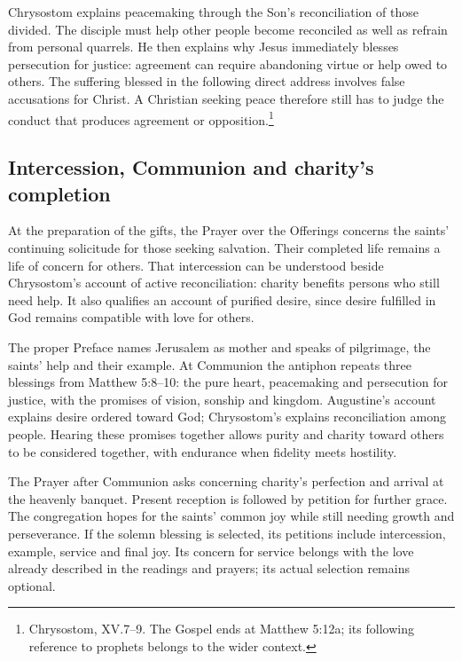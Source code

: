 Chrysostom explains peacemaking through the Son's reconciliation of those divided. The disciple must help other people become reconciled as well as refrain from personal quarrels. He then explains why Jesus immediately blesses persecution for justice: agreement can require abandoning virtue or help owed to others. The suffering blessed in the following direct address involves false accusations for Christ. A Christian seeking peace therefore still has to judge the conduct that produces agreement or opposition.\footnote{Chrysostom,  XV.7--9. The Gospel ends at Matthew 5:12a; its following reference to prophets belongs to the wider context.}

\subsection{Intercession, Communion and charity's completion}
At the preparation of the gifts, the Prayer over the Offerings concerns the saints' continuing solicitude for those seeking salvation. Their completed life remains a life of concern for others. That intercession can be understood beside Chrysostom's account of active reconciliation: charity benefits persons who still need help. It also qualifies an account of purified desire, since desire fulfilled in God remains compatible with love for others.

The proper Preface names Jerusalem as mother and speaks of pilgrimage, the saints' help and their example. At Communion the antiphon repeats three blessings from Matthew 5:8--10: the pure heart, peacemaking and persecution for justice, with the promises of vision, sonship and kingdom. Augustine's account explains desire ordered toward God; Chrysostom's explains reconciliation among people. Hearing these promises together allows purity and charity toward others to be considered together, with endurance when fidelity meets hostility.

The Prayer after Communion asks concerning charity's perfection and arrival at the heavenly banquet. Present reception is followed by petition for further grace. The congregation hopes for the saints' common joy while still needing growth and perseverance. If the solemn blessing is selected, its petitions include intercession, example, service and final joy. Its concern for service belongs with the love already described in the readings and prayers; its actual selection remains optional.
